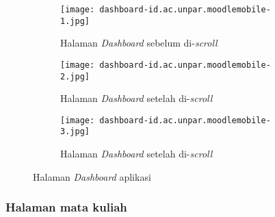 \begin{figure}[H]
	\centering  
	\begin{subfigure}[ht]{.3\textwidth}
	\centering
	\texttt{[image: dashboard-id.ac.unpar.moodlemobile-1.jpg]} 
	\caption{Halaman \textit{Dashboard} sebelum di-\textit{scroll}}
	\end{subfigure}
	\hfill
	\begin{subfigure}[ht]{.3\textwidth}
	\centering
	\texttt{[image: dashboard-id.ac.unpar.moodlemobile-2.jpg]} 
	\caption{Halaman \textit{Dashboard} setelah di-\textit{scroll}}
	\end{subfigure}
	\hfill
	\begin{subfigure}[ht]{.3\textwidth}
	\centering
	\texttt{[image: dashboard-id.ac.unpar.moodlemobile-3.jpg]} 
	\caption{Halaman \textit{Dashboard} setelah di-\textit{scroll}}
	\end{subfigure}

	\caption[Halaman \textit{Dashboard} aplikasi] {Halaman \textit{Dashboard} aplikasi} 
	\label{app:dashboard} 
\end{figure}  

\subsubsection{Halaman mata kuliah}

